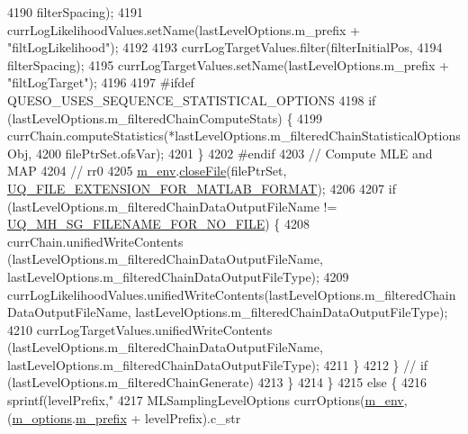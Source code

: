 \begin{DoxyCode}
4190                                        filterSpacing);
4191         currLogLikelihoodValues.setName(lastLevelOptions.m\_prefix + \textcolor{stringliteral}{"filtLogLikelihood"});
4192 
4193         currLogTargetValues.filter(filterInitialPos,
4194                                    filterSpacing);
4195         currLogTargetValues.setName(lastLevelOptions.m\_prefix + \textcolor{stringliteral}{"filtLogTarget"});
4196 
4197 \textcolor{preprocessor}{#ifdef QUESO\_USES\_SEQUENCE\_STATISTICAL\_OPTIONS}
4198 \textcolor{preprocessor}{}        \textcolor{keywordflow}{if} (lastLevelOptions.m\_filteredChainComputeStats) \{
4199           currChain.computeStatistics(*lastLevelOptions.m\_filteredChainStatisticalOptionsObj,
4200                                       filePtrSet.ofsVar);
4201         \}
4202 \textcolor{preprocessor}{#endif}
4203 \textcolor{preprocessor}{}        \textcolor{comment}{// Compute MLE and MAP}
4204         \textcolor{comment}{// rr0}
4205         \hyperlink{class_q_u_e_s_o_1_1_m_l_sampling_a13f1ca4fe9f94822fe572a743eaced1d}{m\_env}.\hyperlink{class_q_u_e_s_o_1_1_base_environment_ab712bff194ddd91459d4ea8715c77e8b}{closeFile}(filePtrSet,
      \hyperlink{_defines_8h_ac440026eff7deb1c1eed1eea0e8e36ba}{UQ\_FILE\_EXTENSION\_FOR\_MATLAB\_FORMAT});
4206 
4207         \textcolor{keywordflow}{if} (lastLevelOptions.m\_filteredChainDataOutputFileName != 
      \hyperlink{_metropolis_hastings_s_g_options_8h_a75699ceb938d800e2b7f59ede3ea9a31}{UQ\_MH\_SG\_FILENAME\_FOR\_NO\_FILE}) \{
4208           currChain.unifiedWriteContents              (lastLevelOptions.m\_filteredChainDataOutputFileName,
      lastLevelOptions.m\_filteredChainDataOutputFileType);
4209           currLogLikelihoodValues.unifiedWriteContents(lastLevelOptions.m\_filteredChainDataOutputFileName,
      lastLevelOptions.m\_filteredChainDataOutputFileType);
4210           currLogTargetValues.unifiedWriteContents    (lastLevelOptions.m\_filteredChainDataOutputFileName,
      lastLevelOptions.m\_filteredChainDataOutputFileType);
4211         \}
4212       \} \textcolor{comment}{// if (lastLevelOptions.m\_filteredChainGenerate)}
4213     \}
4214   \}
4215   \textcolor{keywordflow}{else} \{
4216     sprintf(levelPrefix,\textcolor{stringliteral}{"%
4217     MLSamplingLevelOptions currOptions(\hyperlink{class_q_u_e_s_o_1_1_m_l_sampling_a13f1ca4fe9f94822fe572a743eaced1d}{m\_env},(\hyperlink{class_q_u_e_s_o_1_1_m_l_sampling_af8504cc57ec72b3c52833826b2bfff8e}{m\_options}.\hyperlink{class_q_u_e_s_o_1_1_m_l_sampling_options_a1d3d48598e0b59b46337ce66a52671a5}{m\_prefix} + levelPrefix).c\_str
}
\end{DoxyCode}
